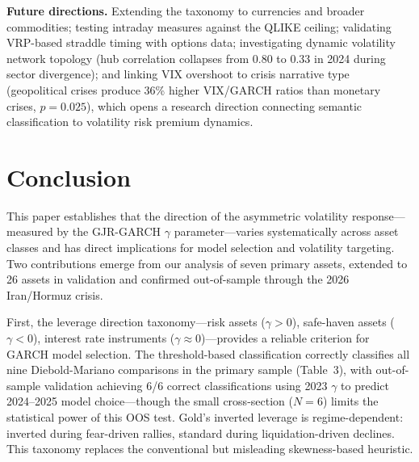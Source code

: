 \textbf{Future directions.} Extending the taxonomy to currencies and broader commodities; testing intraday measures against the QLIKE ceiling; validating VRP-based straddle timing with options data; investigating dynamic volatility network topology (hub correlation collapses from 0.80 to 0.33 in 2024 during sector divergence); and linking VIX overshoot to crisis narrative type (geopolitical crises produce 36\% higher VIX/GARCH ratios than monetary crises, $p = 0.025$), which opens a research direction connecting semantic classification to volatility risk premium dynamics.



\section{Conclusion}

This paper establishes that the direction of the asymmetric volatility response---measured by the GJR-GARCH $\gamma$ parameter---varies systematically across asset classes and has direct implications for model selection and volatility targeting. Two contributions emerge from our analysis of seven primary assets, extended to 26 assets in validation and confirmed out-of-sample through the 2026 Iran/Hormuz crisis.

First, the leverage direction taxonomy---risk assets ($\gamma > 0$), safe-haven assets ($\gamma < 0$), interest rate instruments ($\gamma \approx 0$)---provides a reliable criterion for GARCH model selection. The threshold-based classification correctly classifies all nine Diebold-Mariano comparisons in the primary sample (Table~3), with out-of-sample validation achieving 6/6 correct classifications using 2023 $\gamma$ to predict 2024--2025 model choice---though the small cross-section ($N = 6$) limits the statistical power of this OOS test. Gold's inverted leverage is regime-dependent: inverted during fear-driven rallies, standard during liquidation-driven declines. This taxonomy replaces the conventional but misleading skewness-based heuristic.


